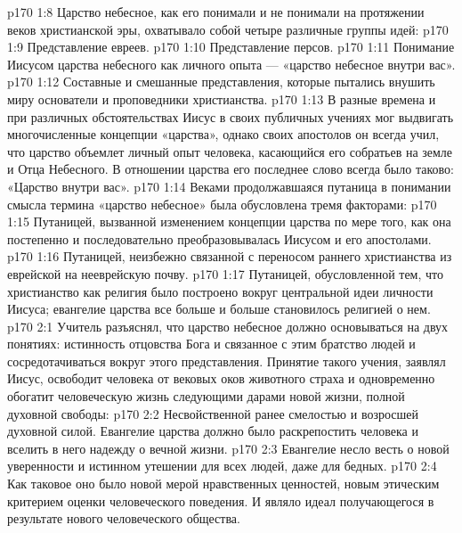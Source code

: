 \vs p170 1:8 Царство небесное, как его понимали и не понимали на протяжении веков христианской эры, охватывало собой четыре различные группы идей:
\vs p170 1:9 \bibnobreakspace Представление евреев.
\vs p170 1:10 \bibnobreakspace Представление персов.
\vs p170 1:11 \bibnobreakspace Понимание Иисусом царства небесного как личного опыта --- «царство небесное внутри вас».
\vs p170 1:12 \bibnobreakspace Составные и смешанные представления, которые пытались внушить миру основатели и проповедники христианства.
\vs p170 1:13 \pc В разные времена и при различных обстоятельствах Иисус в своих публичных учениях мог выдвигать многочисленные концепции «царства», однако своих апостолов он всегда учил, что царство объемлет личный опыт человека, касающийся его собратьев на земле и Отца Небесного. В отношении царства его последнее слово всегда было таково: «Царство внутри вас».
\vs p170 1:14 Веками продолжавшаяся путаница в понимании смысла термина «царство небесное» была обусловлена тремя факторами:
\vs p170 1:15 \bibnobreakspace Путаницей, вызванной изменением концепции царства по мере того, как она постепенно и последовательно преобразовывалась Иисусом и его апостолами.
\vs p170 1:16 \bibnobreakspace Путаницей, неизбежно связанной с переносом раннего христианства из еврейской на нееврейскую почву.
\vs p170 1:17 \bibnobreakspace Путаницей, обусловленной тем, что христианство как религия было построено вокруг центральной идеи личности Иисуса; евангелие царства все больше и больше становилось религией о нем.
\vs p170 2:1 Учитель разъяснял, что царство небесное должно основываться на двух понятиях: истинность отцовства Бога и связанное с этим братство людей и сосредотачиваться вокруг этого представления. Принятие такого учения, заявлял Иисус, освободит человека от вековых оков животного страха и одновременно обогатит человеческую жизнь следующими дарами новой жизни, полной духовной свободы:
\vs p170 2:2 \bibnobreakspace Несвойственной ранее смелостью и возросшей духовной силой. Евангелие царства должно было раскрепостить человека и вселить в него надежду о вечной жизни.
\vs p170 2:3 \pc {}\bibnobreakspace Евангелие несло весть о новой уверенности и истинном утешении для всех людей, даже для бедных.
\vs p170 2:4 \pc {}\bibnobreakspace Как таковое оно было новой мерой нравственных ценностей, новым этическим критерием оценки человеческого поведения. И являло идеал получающегося в результате нового человеческого общества.
